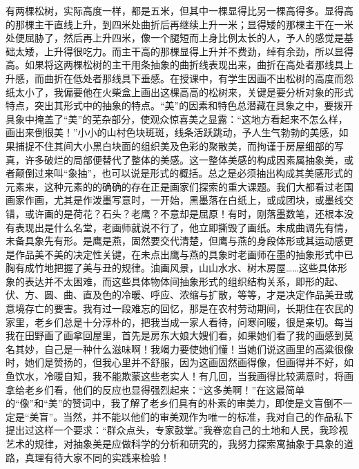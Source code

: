 \documentclass{article}
\begin{document}
有两棵松树，实际高度一样，都是五米，但其中一棵显得比另一棵高得多。显得高的那棵主干直线上升，到四米处曲折后再继续上升一米；显得矮的那棵主干在一米处便屈胁了，然后再上升四米，像一个腿短而上身比例太长的人，予人的感觉是基础太矮，上升得很吃力。而主干高的那棵显得上升并不费劲，绰有余劲，所以显得高。如果将这两棵松树的主干用条抽象的曲折线表现出来，曲折在高处者那线具上升感，而曲折在低处者那线具下垂感。在授课中，有学生因画不出松树的高度而怨纸太小了，我偏要他在火柴盒上画出这棵高高的松树来，关键是要分析对象的形式特点，突出其形式中的抽象的特点。“美”的因素和特色总潜藏在具象之中，要拨开具象中掩盖了“美”的芜杂部分，使观众惊喜美之显露：“这地方看起来不怎么样，画出来倒很美！”小小的山村色块斑斑，线条活跃跳动，予人生气勃勃的美感，如果捕捉不住其间大小黑白块面的组织美及色彩的聚散美，而拘谨于房屋细部的写真，许多破烂的局部便替代了整体的美感。这一整体美感的构成因素属抽象美，或者颠倒过来叫“象抽”，也可以说是形式的概括。总之是必须抽出构成其美感形式的元素来，这种元素的的确确的存在正是画家们探索的重大课题。我们大都看过老国画家作画，尤其是作泼墨写意时，一开始，黑墨落在白纸上，或成团块，或墨线交错，或许画的是荷花？石头？老鹰？不意却是屈原！有时，刚落墨数笔，还根本没有表现出是什么名堂，老画师就说不行了，他立即撕毁了画纸。未成曲调先有情，未备具象先有形。是鹰是燕，固然要交代清楚，但鹰与燕的身段体形或其运动感更是作品美不美的决定性关键，在未点出鹰与燕的具象时老画师在墨的抽象形式中已胸有成竹地把握了美与丑的规律。油画风景，山山水水、树木房屋……这些具体形象的表达并不太困难，而这些具体物体间抽象形式的组织结构关系，即形的起、伏、方、圆、曲、直及色的冷暖、呼应、浓缩与扩散，等等，才是决定作品美丑或意境存亡的要害。我有过一段难忘的回忆，那是在农村劳动期间，长期住在农民的家里，老乡们总是十分淳朴的，把我当成一家人看待，问寒问暖，很是亲切。每当我在田野画了画拿回屋里，首先是房东大娘大嫂们看，如果她们看了我的画感到莫名其妙，自己是一种什么滋味啊！我竭力要使她们懂！当她们说这画里的高粱很像时，她们是赞扬的，但我心里并不舒服，因为这画固然画得像，但画得并不好，如鱼饮水，冷暖自知，我不能欺蒙这些老实人！有几回，当我画得比较满意时，将画拿给老乡们看，他们的反应也显得强烈起来：“这多美啊！”在这最简单的“像”和“美”的赞词中，我了解了老乡们具有的朴素的审美力，即使是文盲倒不一定是“美盲”。当然，并不能以他们的审美观作为唯一的标准，我对自己的作品私下提出过这样一个要求：“群众点头，专家鼓掌。”我眷恋自己的土地和人民，我珍视艺术的规律，对抽象美是应做科学的分析和研究的，我努力探索寓抽象于具象的道路，真理有待大家不同的实践来检验！
\end{document}
